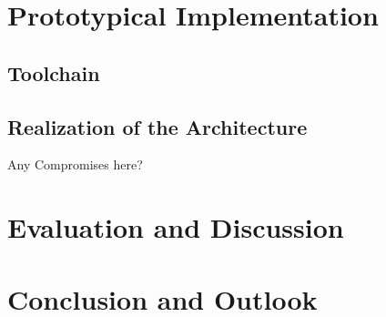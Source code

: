 \documentclass[language=english,noinputenc]{wiwwuwordrprt}
\begin{document}
  \chapter{Prototypical Implementation} %
  \label{cha:implementation}

    \section{Toolchain} %
    \label{sec:toolchain}
    

    \section{Realization of the Architecture} %
    \label{sec:realization_of_the_architecture}
    Any Compromises here?
  

  \chapter{Evaluation and Discussion} %
  \label{cha:evaluation}
  

  \chapter{Conclusion and Outlook} %
  \label{cha:conclusion_and_outlook}
  
  
  
  
\end{document}
